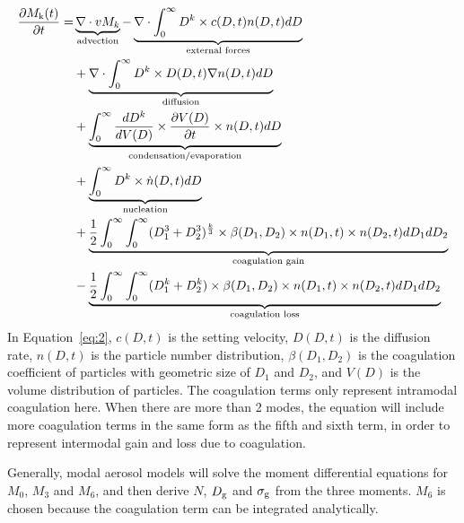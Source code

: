 \documentclass[12pt, fullpage]{uiucthesis2009_2}
\begin{document}
		\begin{align}\label{eq:2}
		\begin{split}
		\frac{\partial M_\text{k}(t)}{\partial t} = &
		\underbrace{\nabla \cdot vM_k}_\text{\clap{advection}} - \underbrace{\nabla \cdot \int_{0}^{\infty}D^k\times c(D,t)n(D,t)dD}_\text{\clap{external forces}} \\
		&+ \underbrace{\nabla \cdot \int_{0}^{\infty}D^k\times D(D,t)\nabla n(D,t)dD}_\text{\clap{diffusion}} \\
		&+ \underbrace{\int_{0}^{\infty}\frac{dD^k}{dV(D)}\times \frac{\partial V(D)}{\partial t}\times n(D,t)dD}_\text{\clap{condensation/evaporation}} \\
		&+ \underbrace{\int_{0}^{\infty}D^k\times \dot n(D,t)dD}_\text{\clap{nucleation}} \\
		&+ \underbrace{\frac{1}{2}\int_{0}^{\infty}\int_{0}^{\infty}
			(D_{1}^3+D_{2}^3)^{\frac{k}{3}}\times \beta(D_{1},D_2)\times n(D_1, t)\times n(D_2,t) dD_1dD_2}_\text{\clap{coagulation gain}} \\
		&-\underbrace{\frac{1}{2}\int_{0}^{\infty}\int_{0}^{\infty}
			(D_{1}^k+D_{2}^k)\times \beta(D_{1},D_2)\times n(D_1, t)\times n(D_2,t) dD_1dD_2}_\text{\clap{coagulation loss}}
		\end{split}
		\end{align}
		In Equation~\ref{eq:2}, $c(D,t)$ is the setting velocity, $D(D,t)$ is the diffusion rate, $n(D,t)$ is the particle number distribution, $\beta(D_{1},D_2)$ is the coagulation coefficient of particles with geometric size of $D_1$ and $D_2$, and $V(D)$ is the volume distribution of particles. The coagulation terms only represent intramodal coagulation here. When there are more than 2 modes, the equation will include more coagulation terms in the same form as the fifth and sixth term, in order to represent intermodal gain and loss due to coagulation.
		
		Generally, modal aerosol models will solve the moment differential equations for $M_0$, $M_3$ and $M_6$, and then derive $N$, $D_{\rm g}$ and $\sigma_{\rm g}$ from the three moments. $M_6$ is chosen because the coagulation term can be integrated analytically.
		 
\end{document}

